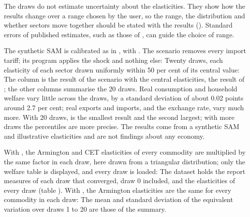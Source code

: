 The draws do not estimate uncertainty about the elasticities. They show how
the results change over a range chosen by the user, so the range, the
distribution and whether sectors move together should be stated with the
results (). Standard errors of published estimates,
such as those of \mbox{}, can guide the choice of range.


The synthetic SAM is calibrated as in , with
. The scenario removes every import
tariff; its program applies the shock and nothing else:
Twenty draws, each elasticity of each sector drawn uniformly within 50 per
cent of its central value:
The column  is the result of the scenario with the central
elasticities, the result of \mbox{}; the other columns summarise
the 20 draws. Real consumption and household welfare vary little across the
draws, by a standard deviation of about 0.02 points around 2.7 per cent; real
exports and imports, and the exchange rate, vary much more. With 20 draws,
 is the smallest result and  the second largest; with more
draws the percentiles are more precise. The results come from a synthetic SAM and
illustrative elasticities and are not findings about any economy.


With , the Armington and CET elasticities of every commodity
are multiplied by the same factor in each draw, here drawn from a triangular
distribution; only the welfare table is displayed, and every draw is loaded:
The dataset holds the report measures of each draw that converged, draw 0
included, and the elasticities of every draw (table ). With
, the Armington elasticities are the same for every commodity
in each draw:
The mean and standard deviation of the equivalent variation over draws 1 to
20 are those of the summary.


